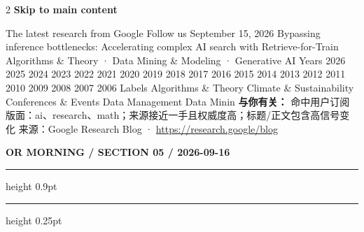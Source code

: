 \documentclass[10.5pt]{ctexart}
\begin{document}
\begin{multicols}{2}
\vspace{2mm}
{\large\bfseries Skip to main content}\par
The latest research from Google Follow us September 15, 2026 Bypassing inference bottlenecks: Accelerating complex AI search with Retrieve-for-Train Algorithms \& Theory · Data Mining \& Modeling · Generative AI Years 2026 2025 2024 2023 2022 2021 2020 2019 2018 2017 2016 2015 2014 2013 2012 2011 2010 2009 2008 2007 2006 Labels Algorithms \& Theory Climate \& Sustainability Conferences \& Events Data Management Data Minin
\textbf{与你有关：} 命中用户订阅版面：ai、research、math；来源接近一手且权威度高；标题/正文包含高信号变化
{\footnotesize\color{ormuted} 来源：Google Research Blog · \url{https://research.google/blog}}
\end{multicols}
\newpage
{\small\bfseries OR MORNING / SECTION 05 / 2026-09-16}
\vspace{2mm}
\hrule height 0.9pt
\vspace{1.5mm}
\hrule height 0.25pt
\vspace{4mm}
\end{document}
